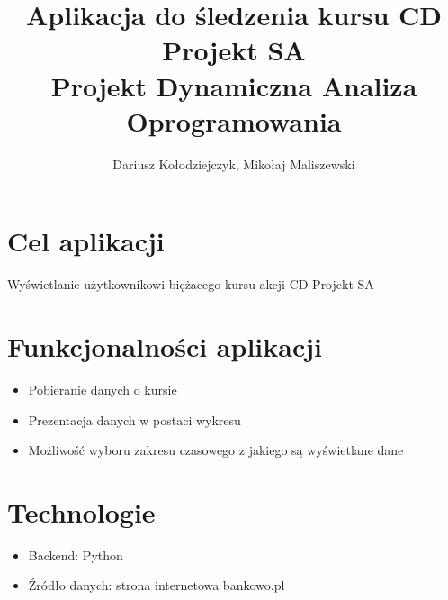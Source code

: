 \documentclass{article}
\begin{document}
		\title{Aplikacja do śledzenia kursu CD Projekt SA \\ Projekt Dynamiczna Analiza Oprogramowania}
	\author{Dariusz Kołodziejczyk, Mikołaj Maliszewski}
	\maketitle
	\section{Cel aplikacji}
	Wyświetlanie użytkownikowi biężacego kursu akcji CD Projekt SA 
	\section{Funkcjonalności aplikacji}
	\begin{itemize}
		\item Pobieranie danych o kursie 
		\item Prezentacja danych w postaci wykresu
		\item Możliwość wyboru zakresu czasowego z jakiego są wyświetlane dane
	\end{itemize}
	\section{Technologie}
	\begin{itemize}
		\item 	Backend: Python
		\item Źródło danych: strona internetowa bankowo.pl 
	\end{itemize}
	
\end{document}

